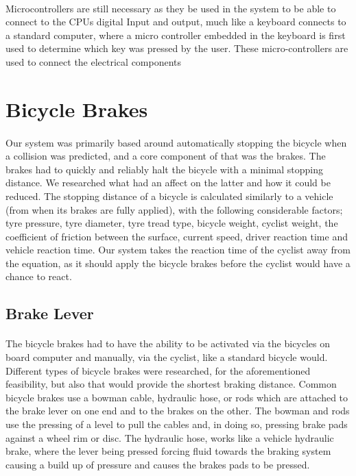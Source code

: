 \documentclass[a4paper]{report}
\begin{document}
\paragraph{}Microcontrollers are still necessary as they be used in the system to be able to connect to the CPUs digital Input and output, much like a keyboard connects to a standard computer, where a micro controller embedded in the keyboard is first used to determine which key was pressed by the user. These micro-controllers are used to connect the electrical components 

\section{Bicycle Brakes}

\paragraph{}Our system was primarily based around automatically stopping the bicycle when a collision was predicted, and a core component of that was the brakes. The brakes had to quickly and reliably halt the bicycle with a minimal stopping distance. We researched what had an affect on the latter and how it could be reduced. The stopping distance of a bicycle is calculated similarly to a vehicle (from when its brakes are fully applied), with the following considerable factors; tyre pressure, tyre diameter, tyre tread type, bicycle weight, cyclist weight, the coefficient of friction between the surface, current speed, driver reaction time and vehicle reaction time. Our system takes the reaction time of the cyclist away from the equation, as it should apply the bicycle brakes before the cyclist would have a chance to react. 

\subsection{Brake Lever}
\label{sec:brake_lever}

\paragraph{}The bicycle brakes had to have the ability to be activated via the bicycles on board computer and manually, via the cyclist, like a standard bicycle would. Different types of bicycle brakes were researched, for the aforementioned feasibility, but also that would provide the shortest braking distance. Common bicycle brakes use a bowman cable, hydraulic hose, or rods which are attached to the brake lever on one end and to the brakes on the other. The bowman and rods use the pressing of a level to pull the cables and, in doing so, pressing brake pads against a wheel rim or disc. The hydraulic hose, works like a vehicle hydraulic brake, where the lever being pressed forcing fluid towards the braking system causing a build up of pressure and causes the brakes pads to be pressed. 
\end{document}
